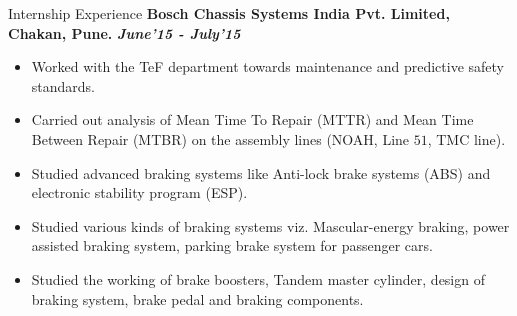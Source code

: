 \documentclass[11pt]{resume}
\newenvironment{outerlist}[1][\enskip\textbullet]%
{\begin{itemize}[#1,leftmargin=*]}{\end{itemize}%
	\vspace{-.5\baselineskip}}
\begin{document}
\vspace{8mm}
\begin{rSection}{Internship Experience}
	{\textbf{Bosch Chassis Systems India Pvt. Limited, Chakan, Pune.} \hfill \textit{\textbf{June'15 - July'15}}}
	\begin{outerlist}
		\item  Worked with the TeF department towards maintenance and predictive safety standards.
		\item  Carried out analysis of Mean Time To Repair (MTTR) and Mean Time Between Repair (MTBR) on the assembly lines (NOAH, Line $51$, TMC line).
		\item  Studied advanced braking systems like Anti-lock brake systems (ABS) and electronic stability program (ESP).
		\item  Studied various kinds of braking systems viz. Mascular-energy braking, power assisted braking system, parking brake system for passenger cars.
		\item  Studied the working of brake boosters, Tandem master cylinder, design of braking system, brake pedal and braking components.
	\end{outerlist}
\end{rSection}
\vspace{8mm}
\end{document}
